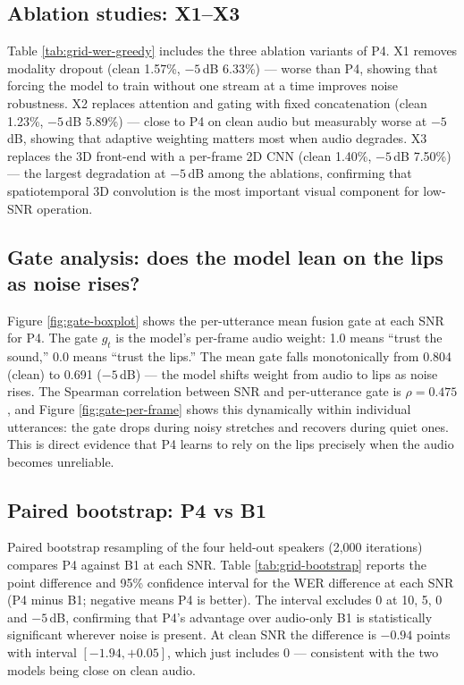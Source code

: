 \subsection{Ablation studies: X1--X3}

Table \ref{tab:grid-wer-greedy} includes the three ablation variants of P4. X1 removes modality dropout (clean 1.57\%, $-5$\,dB 6.33\%) --- worse than P4, showing that forcing the model to train without one stream at a time improves noise robustness. X2 replaces attention and gating with fixed concatenation (clean 1.23\%, $-5$\,dB 5.89\%) --- close to P4 on clean audio but measurably worse at $-5$\,dB, showing that adaptive weighting matters most when audio degrades. X3 replaces the 3D front-end with a per-frame 2D CNN (clean 1.40\%, $-5$\,dB 7.50\%) --- the largest degradation at $-5$\,dB among the ablations, confirming that spatiotemporal 3D convolution is the most important visual component for low-SNR operation.

\subsection{Gate analysis: does the model lean on the lips as noise rises?}

Figure \ref{fig:gate-boxplot} shows the per-utterance mean fusion gate at each SNR for P4. The gate $g_t$ is the model's per-frame audio weight: 1.0 means ``trust the sound,'' 0.0 means ``trust the lips.'' The mean gate falls monotonically from 0.804 (clean) to 0.691 ($-5$\,dB) --- the model shifts weight from audio to lips as noise rises. The Spearman correlation between SNR and per-utterance gate is $\rho = 0.475$, and Figure \ref{fig:gate-per-frame} shows this dynamically within individual utterances: the gate drops during noisy stretches and recovers during quiet ones. This is direct evidence that P4 learns to rely on the lips precisely when the audio becomes unreliable.

\subsection{Paired bootstrap: P4 vs B1}

Paired bootstrap resampling of the four held-out speakers (2,000 iterations) compares P4 against B1 at each SNR. Table \ref{tab:grid-bootstrap} reports the point difference and 95\% confidence interval for the WER difference at each SNR (P4 minus B1; negative means P4 is better). The interval excludes 0 at 10, 5, 0 and $-5$\,dB, confirming that P4's advantage over audio-only B1 is statistically significant wherever noise is present. At clean SNR the difference is $-0.94$ points with interval $[-1.94, +0.05]$, which just includes 0 --- consistent with the two models being close on clean audio.

